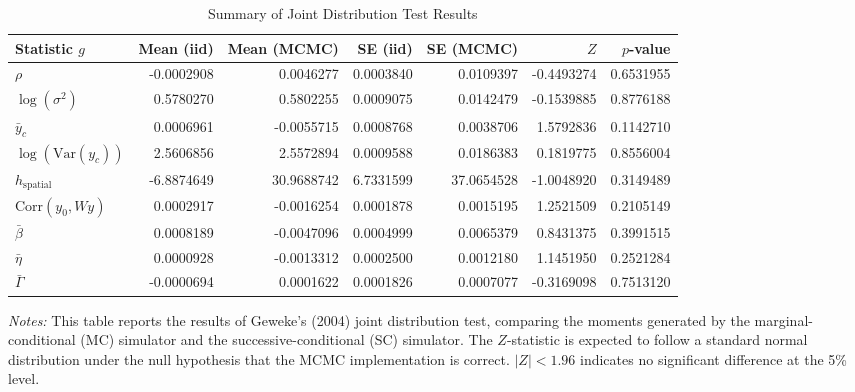\begin{table}[H]

\caption{Summary of Joint Distribution Test Results}
\label{tab:jdt_summary}
\centering
\begin{tabular}[t]{lrrrrrr}
\toprule
Statistic $g$ & Mean (iid) & Mean (MCMC) & SE (iid) & SE (MCMC) & $Z$ & $p$-value\\
\midrule
$\rho$ & -0.0002908 & 0.0046277 & 0.0003840 & 0.0109397 & -0.4493274 & 0.6531955\\
$\log(\sigma^2)$ & 0.5780270 & 0.5802255 & 0.0009075 & 0.0142479 & -0.1539885 & 0.8776188\\
$\bar{y}_c$ & 0.0006961 & -0.0055715 & 0.0008768 & 0.0038706 & 1.5792836 & 0.1142710\\
$\log(\mathrm{Var}(y_c))$ & 2.5606856 & 2.5572894 & 0.0009588 & 0.0186383 & 0.1819775 & 0.8556004\\
$h_{\text{spatial}}$ & -6.8874649 & 30.9688742 & 6.7331599 & 37.0654528 & -1.0048920 & 0.3149489\\
\addlinespace
$\mathrm{Corr}(y_0, Wy)$ & 0.0002917 & -0.0016254 & 0.0001878 & 0.0015195 & 1.2521509 & 0.2105149\\
$\bar{\beta}$ & 0.0008189 & -0.0047096 & 0.0004999 & 0.0065379 & 0.8431375 & 0.3991515\\
$\bar{\eta}$ & 0.0000928 & -0.0013312 & 0.0002500 & 0.0012180 & 1.1451950 & 0.2521284\\
$\bar{\Gamma}$ & -0.0000694 & 0.0001622 & 0.0001826 & 0.0007077 & -0.3169098 & 0.7513120\\
\bottomrule
\end{tabular}
\begin{tablenotes}
  \footnotesize
  \item \textit{Notes:} This table reports the results of Geweke's (2004) joint distribution test, comparing the moments generated by the marginal-conditional (MC) simulator and the successive-conditional (SC) simulator. The $Z$-statistic is expected to follow a standard normal distribution under the null hypothesis that the MCMC implementation is correct. $|Z| < 1.96$ indicates no significant difference at the 5\% level.
\end{tablenotes}
\end{table}